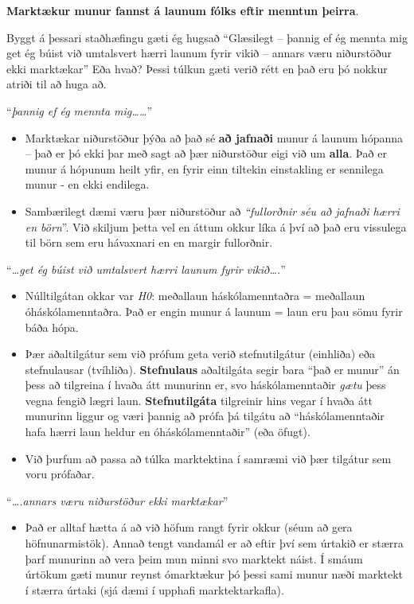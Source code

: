 \documentclass[
]{book}
\providecommand{\tightlist}{%
  \setlength{\itemsep}{0pt}\setlength{\parskip}{0pt}}
\begin{document}
\textbf{Marktækur munur fannst á launum fólks eftir menntun þeirra}.

Byggt á þessari staðhæfingu gæti ég hugsað ``Glæsilegt -- þannig ef ég mennta mig get ég búist við umtalsvert hærri launum fyrir vikið -- annars væru niðurstöður ekki marktækar'' Eða hvað? Þessi túlkun gæti verið rétt en það eru þó nokkur atriði til að huga að.

``\emph{þannig ef ég mennta mig\ldots\ldots{}}''

\begin{itemize}
\item
  Marktækar niðurstöður þýða að það sé \textbf{að jafnaði} munur á launum hópanna -- það er þó ekki þar með sagt að þær niðurstöður eigi við um \textbf{alla}. Það er munur á hópunum heilt yfir, en fyrir einn tiltekin einstakling er sennilega munur - en ekki endilega.
\item
  Sambærilegt dæmi væru þær niðurstöður að \emph{``fullorðnir séu að jafnaði hærri en börn}''. Við skiljum þetta vel en áttum okkur líka á því að það eru vissulega til börn sem eru hávaxnari en en margir fullorðnir.
\end{itemize}

``\emph{\ldots get ég búist við umtalsvert hærri launum fyrir vikið\ldots.}''

\begin{itemize}
\item
  Núlltilgátan okkar var \emph{H0}: meðallaun háskólamenntaðra = meðallaun óháskólamenntaðra. Það er engin munur á launum = laun eru þau sömu fyrir báða hópa.
\item
  Þær aðaltilgátur sem við prófum geta verið stefnutilgátur (einhliða) eða stefnulausar (tvíhliða). \textbf{Stefnulaus} aðaltilgáta segir bara ``það er munur'' án þess að tilgreina í hvaða átt munurinn er, svo háskólamenntaðir \emph{gætu} þess vegna fengið lægri laun. \textbf{Stefnutilgáta} tilgreinir hins vegar í hvaða átt munurinn liggur og væri þannig að prófa þá tilgátu að ``háskólamenntaðir hafa hærri laun heldur en óháskólamenntaðir'' (eða öfugt).
\item
  Við þurfum að passa að túlka marktektina í samræmi við þær tilgátur sem voru prófaðar.
\end{itemize}

``\emph{\ldots.annars væru niðurstöður ekki marktækar}''

\begin{itemize}
\tightlist
\item
  Það er alltaf hætta á að við höfum rangt fyrir okkur (séum að gera höfnunarmistök). Annað tengt vandamál er að eftir því sem úrtakið er stærra þarf munurinn að vera þeim mun minni svo marktekt náist. Í smáum úrtökum gæti munur reynst ómarktækur þó þessi sami munur næði marktekt í stærra úrtaki (sjá dæmi í upphafi marktektarkafla).
\end{itemize}
\end{document}
